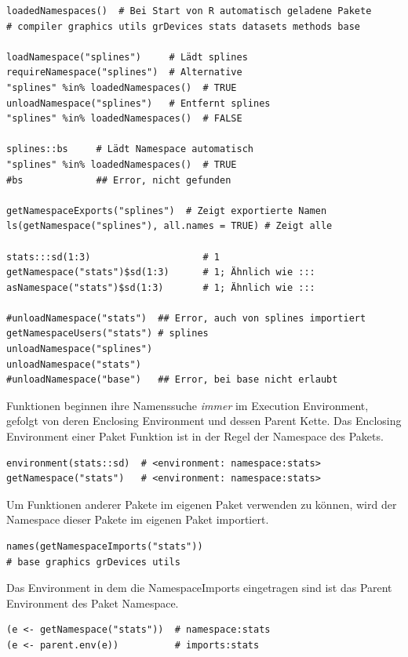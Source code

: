 \documentclass[10pt,twocolumn]{scrartcl}
\begin{document}
\begin{lstlisting}
loadedNamespaces()  # Bei Start von R automatisch geladene Pakete
# compiler graphics utils grDevices stats datasets methods base

loadNamespace("splines")     # Lädt splines
requireNamespace("splines")  # Alternative
"splines" %in% loadedNamespaces()  # TRUE
unloadNamespace("splines")   # Entfernt splines
"splines" %in% loadedNamespaces()  # FALSE

splines::bs     # Lädt Namespace automatisch
"splines" %in% loadedNamespaces()  # TRUE
#bs             ## Error, nicht gefunden

getNamespaceExports("splines")  # Zeigt exportierte Namen
ls(getNamespace("splines"), all.names = TRUE) # Zeigt alle

stats:::sd(1:3)                    # 1
getNamespace("stats")$sd(1:3)      # 1; Ähnlich wie :::
asNamespace("stats")$sd(1:3)       # 1; Ähnlich wie :::

#unloadNamespace("stats")  ## Error, auch von splines importiert
getNamespaceUsers("stats") # splines
unloadNamespace("splines")
unloadNamespace("stats")
#unloadNamespace("base")   ## Error, bei base nicht erlaubt
\end{lstlisting}

Funktionen beginnen ihre Namenssuche \emph{immer} im Execution Environment, gefolgt von deren Enclosing Environment und dessen Parent Kette. Das Enclosing Environment einer Paket Funktion ist in der Regel der Namespace des Pakets.

\begin{lstlisting}
environment(stats::sd)  # <environment: namespace:stats>
getNamespace("stats")   # <environment: namespace:stats>
\end{lstlisting}

Um Funktionen anderer Pakete im eigenen Paket verwenden zu können, wird der Namespace dieser Pakete im eigenen Paket importiert.

\begin{lstlisting}
names(getNamespaceImports("stats"))
# base graphics grDevices utils
\end{lstlisting}

Das Environment in dem die NamespaceImports eingetragen sind ist das Parent Environment des Paket Namespace.

\begin{lstlisting}
(e <- getNamespace("stats"))  # namespace:stats
(e <- parent.env(e))          # imports:stats
\end{lstlisting}
\end{document}

